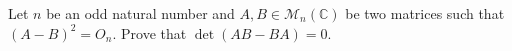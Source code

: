 Let $n$ be an odd natural number and $A,B \in \mathcal{M}_n(\mathbb{C})$ be two matrices such that $(A-B)^2=O_n.$ Prove that $\det(AB-BA)=0.$